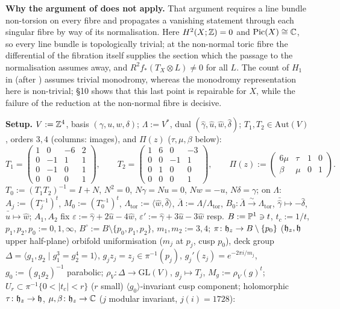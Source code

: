 \medskip
\noindent\textbf{Why the argument of \cite{CDP20} does not apply.}
That argument requires a line bundle non-torsion on every fibre and propagates a vanishing statement through each singular fibre by way of its normalisation. Here $H^2(X;\mathbb{Z}) = 0$ and $\mathrm{Pic}(X) \cong \mathbb{C}$, so every line bundle is topologically trivial; at the non-normal toric fibre the differential of the fibration itself supplies the section which the passage to the normalisation assumes away, and $R^2 f_*(T_X \otimes L) \ne 0$ for all $L$. The count of $H_1$ in \cite[Lemma 4.2]{CDP20} (after \cite[Lemma 3.2]{CDP98}) assumes trivial monodromy, whereas the monodromy representation here is non-trivial; \S10 shows that this last point is repairable for $X$, while the failure of the reduction at the non-normal fibre is decisive.

\bigskip
\noindent\textbf{Setup.}
$V := \mathbb{Z}^4$, basis $(\gamma,u,w,\delta)$; $\Lambda := V^*$, dual $(\hat\gamma,\hat u,\hat w,\hat\delta)$; $T_1, T_2 \in \mathrm{Aut}(V)$, orders $3,4$ (columns: images), and $\Pi(z)$ ($\tau,\mu,\beta$ below):
\[
T_1 = \begin{pmatrix} 1 & 0 & -6 & 2 \\ 0 & -1 & 1 & 1 \\ 0 & -1 & 0 & 1 \\ 0 & 0 & 0 & 1 \end{pmatrix}, \qquad
T_2 = \begin{pmatrix} 1 & 6 & 0 & -3 \\ 0 & 0 & -1 & 1 \\ 0 & 1 & 0 & 0 \\ 0 & 0 & 0 & 1 \end{pmatrix}, \qquad
\Pi(z) := \begin{pmatrix} 6\mu & \tau & 1 & 0 \\ \beta & \mu & 0 & 1 \end{pmatrix}.
\]
$T_0 := (T_1 T_2)^{-1} = I + N$, $N^2 = 0$, $N\gamma = Nu = 0$, $Nw = -u$, $N\delta = \gamma$; on $\Lambda$: $A_j := (T_j^{-1})^t$, $M_0 := (T_0^{-1})^t$, $\Lambda_{\mathrm{tor}} := \langle \hat w, \hat\delta\rangle$, $\bar\Lambda := \Lambda/\Lambda_{\mathrm{tor}}$, $B_0 \colon \bar\Lambda \xrightarrow{\sim} \Lambda_{\mathrm{tor}}$, $\bar{\hat\gamma} \mapsto -\hat\delta$, $\bar{\hat u} \mapsto \hat w$; $A_1, A_2$ fix $\varepsilon := \hat\gamma + 2\hat u - 4\hat w$, $\varepsilon' := \hat\gamma + 3\hat u - 3\hat w$ resp. $B := \mathbb{P}^1 \ni t$, $t_c := 1/t$, $p_1,p_2,p_0 := 0,1,\infty$, $B^\circ := B \setminus \{p_0,p_1,p_2\}$, $m_1,m_2 := 3,4$; $\pi \colon \mathfrak{h}_z \to B \setminus \{p_0\}$ ($\mathfrak{h}_z, \mathfrak{h}$ upper half-plane) orbifold uniformisation ($m_j$ at $p_j$, cusp $p_0$), deck group $\Delta = \langle g_1,g_2 \mid g_1^3 = g_2^4 = 1\rangle$, $g_j z_j = z_j \in \pi^{-1}(p_j)$, $g_j'(z_j) = e^{-2\pi i/m_j}$, $g_0 := (g_1 g_2)^{-1}$ parabolic; $\rho_V \colon \Delta \to \mathrm{GL}(V)$, $g_j \mapsto T_j$, $M_g := \rho_V(g)^t$; $U_r \subset \pi^{-1}\{0 < |t_c| < r\}$ ($r$ small) $\langle g_0\rangle$-invariant cusp component; holomorphic $\tau \colon \mathfrak{h}_z \to \mathfrak{h}$, $\mu,\beta \colon \mathfrak{h}_z \to \mathbb{C}$ ($j$ modular invariant, $j(i) = 1728$):
